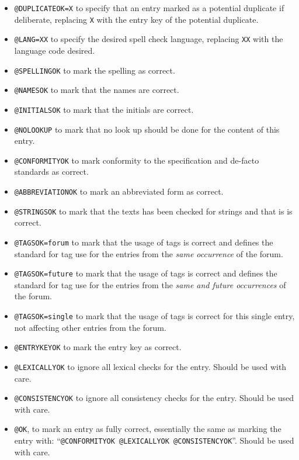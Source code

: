 \begin{itemize}
\item \texttt{@DUPLICATEOK=X} to specify that an entry marked as a
  potential duplicate if deliberate, replacing \texttt{X} with the
  entry key of the potential duplicate.
\item \texttt{@LANG=XX} to specify the desired spell check language,
  replacing \texttt{XX} with the language code desired.
\item \texttt{@SPELLINGOK} to mark the spelling as correct.
\item \texttt{@NAMESOK} to mark that the names are correct.
\item \texttt{@INITIALSOK} to mark that the initials are correct.
\item \texttt{@NOLOOKUP} to mark that no look up should be done for
  the content of this entry.
\item \texttt{@CONFORMITYOK} to mark conformity to the specification
  and de-facto standards as correct.
\item \texttt{@ABBREVIATIONOK} to mark an abbreviated form as correct.
\item \texttt{@STRINGSOK} to mark that the texts has been checked for
  strings and that is is correct.
\item \texttt{@TAGSOK=forum} to mark that the usage of tags is correct and
  defines the standard for tag use for the entries from the \emph{same
  occurrence} of the forum.
\item \texttt{@TAGSOK=future} to mark that the usage of tags is
  correct and defines the standard for tag use for the entries from
  the \emph{same and future occurrences} of the forum.
\item \texttt{@TAGSOK=single} to mark that the usage of tags is
  correct for this single entry, not affecting other entries from the
  forum.
\item \texttt{@ENTRYKEYOK} to mark the entry key as correct.
\item \texttt{@LEXICALLYOK} to ignore all lexical checks for the
  entry.  Should be used with care.
\item \texttt{@CONSISTENCYOK} to ignore all consistency checks for the
  entry.  Should be used with care.
\item \texttt{@OK}, to mark an entry as fully correct, essentially the
  same as marking the entry with: ``\texttt{@CONFORMITYOK @LEXICALLYOK
    @CONSISTENCYOK}''.  Should be used with care.
\end{itemize}


